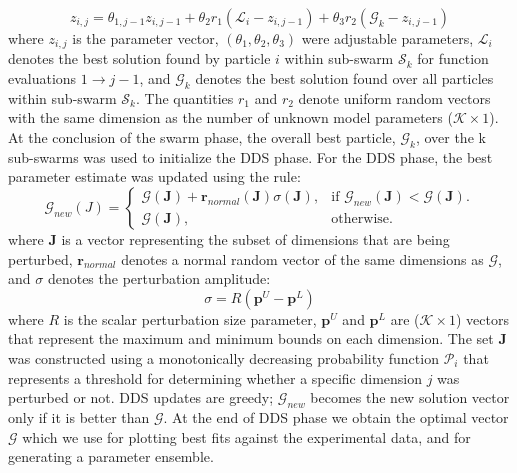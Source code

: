 \documentclass[12pt]{article}
\begin{document}
\begin{equation}\label{eqn:update-rule}
	{z}_{i,j} = \theta_{1,j-1}{z}_{i,j-1} + \theta_{2}{r}_{1}\left(\mathcal{L}_{i} - {z}_{i,j-1}\right) + \theta_{3}{r}_{2}\left(\mathcal{G}_{k} - {z}_{i,j-1}\right)
\end{equation}
where ${z}_{i,j}$ is the parameter vector, $\left(\theta_{1},\theta_{2},\theta_{3}\right)$ were adjustable parameters, $\mathcal{L}_{i}$ denotes the best solution found by particle $i$ within sub-swarm
$\mathcal{S}_{k}$ for function evaluations $1\rightarrow j-1$, and
$\mathcal{G}_{k}$ denotes the best solution found over all particles within sub-swarm $\mathcal{S}_{k}$.
The quantities $r_{1}$ and $r_{2}$ denote uniform random vectors with the same dimension as the number of unknown model parameters ($\mathcal{K}\times{1}$).
At the conclusion of the swarm phase, the overall best particle, $\mathcal{G}_{k}$, over the k sub-swarms was used to initialize the DDS phase.
For the DDS phase, the best parameter estimate was updated using the rule:
\begin{equation}
  \mathcal{G}_{new}({J})=\begin{cases}
    \mathcal{G}(\mathbf{J})+\mathbf{r}_{normal}(\mathbf{J})\sigma(\mathbf{J}), & \text{if $\mathcal{G}_{new}(\mathbf{J})<\mathcal{G}(\mathbf{J})$}.\\
    \mathcal{G}(\mathbf{J}), & \text{otherwise}.
  \end{cases}
\end{equation}
where $\mathbf{J}$ is a vector representing the subset of dimensions that are being perturbed, $\mathbf{r}_{normal}$ denotes a normal random vector of the same dimensions as $\mathcal{G}$,
and $\sigma$ denotes the perturbation amplitude:
\begin{equation}
	\sigma = {R}(\mathbf{p}^U - \mathbf{p}^L)
\end{equation}
where ${R}$ is the scalar perturbation size parameter, $\mathbf{p}^U$ and $\mathbf{p}^L$ are ($\mathcal{K}\times{1}$) vectors that represent the maximum and minimum bounds on each dimension. The set $\mathbf{J}$ was constructed using a monotonically decreasing probability function $\mathcal{P}_{i}$ that represents a threshold for determining whether a specific dimension $j$ was perturbed or not. DDS updates are greedy; $\mathcal{G}_{new}$ becomes the new solution vector only if it is better than $\mathcal{G}$.
At the end of DDS phase we obtain the optimal vector  $\mathcal{G}$ which we use for plotting best fits against the experimental data, and for generating a parameter ensemble.
\end{document}
